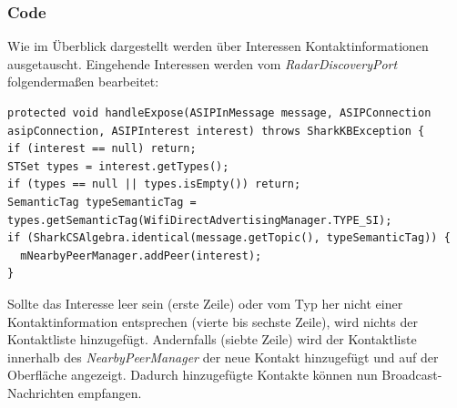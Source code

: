 \subsubsection{Code}
Wie im Überblick dargestellt werden über Interessen Kontaktinformationen ausgetauscht. Eingehende Interessen werden vom \textit{RadarDiscoveryPort} folgendermaßen bearbeitet:\newline
 \lstset{language=Java, caption=Verwertung von  Kontakt-Interessen (Auszug), label=DescriptiveLabel, numbers=left, numbersep=1em, breaklines=true, basicstyle=\small}
\begin{lstlisting}
protected void handleExpose(ASIPInMessage message, ASIPConnection asipConnection, ASIPInterest interest) throws SharkKBException {
if (interest == null) return;
STSet types = interest.getTypes();
if (types == null || types.isEmpty()) return;
SemanticTag typeSemanticTag = types.getSemanticTag(WifiDirectAdvertisingManager.TYPE_SI);
if (SharkCSAlgebra.identical(message.getTopic(), typeSemanticTag)) {
  mNearbyPeerManager.addPeer(interest);
}
\end{lstlisting}
Sollte das Interesse leer sein (erste Zeile) oder vom Typ her nicht einer Kontaktinformation entsprechen (vierte bis sechste Zeile), wird nichts der Kontaktliste hinzugefügt. Andernfalls (siebte Zeile) wird der Kontaktliste innerhalb des \textit{NearbyPeerManager} der neue Kontakt hinzugefügt und auf der Oberfläche angezeigt. Dadurch hinzugefügte Kontakte können nun Broadcast-Nachrichten empfangen.
\newpage
